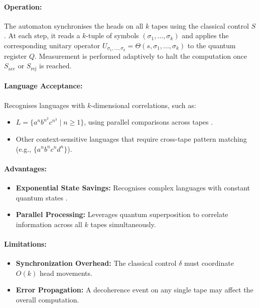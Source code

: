 \paragraph{Operation:}  
The automaton synchronises the heads on all \( k \) tapes using the classical control \( S \). At each step, it reads a \( k \)-tuple of symbols \((\sigma_1, \dots, \sigma_k)\) and applies the corresponding unitary operator \( U_{\sigma_1, \dots, \sigma_k} = \Theta(s, \sigma_1, \dots, \sigma_k) \) to the quantum register \( Q \). Measurement is performed adaptively to halt the computation once \( S_{\text{acc}} \) or \( S_{\text{rej}} \) is reached.

\paragraph{Language Acceptance:}  
Recognises languages with \( k \)-dimensional correlations, such as:
\begin{itemize}
    \item \( L = \{a^n b^{n^2} c^{n^3} \mid n \geq 1\} \), using parallel comparisons across tapes \cite{zheng2012two}.
    \item Other context-sensitive languages that require cross-tape pattern matching (e.g., \( \{a^n b^n c^n d^n\} \)).
\end{itemize}

\paragraph{Advantages:}
\begin{itemize}
    \item \textbf{Exponential State Savings:} Recognises complex languages with constant quantum states \cite{ambainis2002}.
    \item \textbf{Parallel Processing:} Leverages quantum superposition to correlate information across all \( k \) tapes simultaneously.
\end{itemize}

\paragraph{Limitations:}
\begin{itemize}
    \item \textbf{Synchronization Overhead:} The classical control \( \delta \) must coordinate \( O(k) \) head movements.
    \item \textbf{Error Propagation:} A decoherence event on any single tape may affect the overall computation.
\end{itemize}


